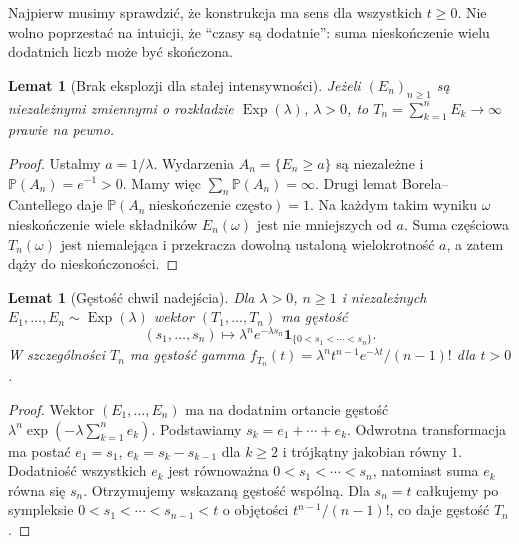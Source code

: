 \documentclass[11pt,a4paper,oneside]{report}
\numberwithin{equation}{chapter}
\theoremstyle{plain}
\newtheorem{lemat}[twierdzenie]{Lemat}
\theoremstyle{definition}
\theoremstyle{remark}
\newcommand{\Prob}{\mathbb{P}}
\newcommand{\ind}[1]{\mathbf{1}_{#1}}
\begin{document}
Najpierw musimy sprawdzić, że konstrukcja ma sens dla wszystkich
$t\ge0$. Nie wolno poprzestać na intuicji, że ``czasy są dodatnie'':
suma nieskończenie wielu dodatnich liczb może być skończona.

\begin{lemat}[Brak eksplozji dla stałej intensywności]
Jeżeli $(E_n)_{n\ge1}$ są niezależnymi zmiennymi o rozkładzie
$\operatorname{Exp}(\lambda)$, $\lambda>0$, to
$T_n=\sum_{k=1}^n E_k\to\infty$ prawie na pewno.
\end{lemat}
\begin{proof}
Ustalmy $a=1/\lambda$. Wydarzenia $A_n=\{E_n\ge a\}$ są niezależne
i $\Prob(A_n)=e^{-1}>0$. Mamy więc
$\sum_n\Prob(A_n)=\infty$. Drugi lemat Borela--Cantellego daje
$\Prob(A_n\ \text{nieskończenie często})=1$. Na każdym takim
wyniku $\omega$ nieskończenie wiele składników $E_n(\omega)$ jest
nie mniejszych od $a$. Suma częściowa $T_n(\omega)$ jest niemalejąca
i przekracza dowolną ustaloną wielokrotność $a$, a zatem dąży do
nieskończoności.
\end{proof}

\begin{lemat}[Gęstość chwil nadejścia]
Dla $\lambda>0$, $n\ge1$ i niezależnych
$E_1,\ldots,E_n\sim\operatorname{Exp}(\lambda)$ wektor
$(T_1,\ldots,T_n)$ ma gęstość
\[
(s_1,\ldots,s_n)\longmapsto
\lambda^n e^{-\lambda s_n}\ind{\{0<s_1<\cdots<s_n\}}.
\]
W szczególności $T_n$ ma gęstość gamma
$f_{T_n}(t)=\lambda^n t^{n-1}e^{-\lambda t}/(n-1)!$ dla $t>0$.
\end{lemat}
\begin{proof}
Wektor $(E_1,\ldots,E_n)$ ma na dodatnim ortancie gęstość
$\lambda^n\exp(-\lambda\sum_{k=1}^n e_k)$.
Podstawiamy $s_k=e_1+\cdots+e_k$. Odwrotna transformacja ma postać
$e_1=s_1$, $e_k=s_k-s_{k-1}$ dla $k\ge2$ i trójkątny jakobian
równy $1$. Dodatniość wszystkich $e_k$ jest równoważna
$0<s_1<\cdots<s_n$, natomiast suma $e_k$ równa się $s_n$.
Otrzymujemy wskazaną gęstość wspólną. Dla $s_n=t$ całkujemy po
sympleksie $0<s_1<\cdots<s_{n-1}<t$ o objętości
$t^{n-1}/(n-1)!$, co daje gęstość $T_n$.
\end{proof}
\end{document}
